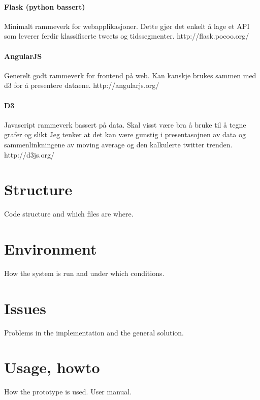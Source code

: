 \paragraph{Flask (python bassert)}
Minimalt rammeverk for webapplikasjoner. Dette gjør det enkelt å lage et API som
leverer ferdir klassifiserte tweets og tidssegmenter.
http://flask.pocoo.org/

\paragraph{AngularJS}
Generelt godt rammeverk for frontend på web. Kan kanskje brukes sammen med d3
for å presentere dataene.
http://angularjs.org/

\paragraph{D3}
Javascript rammeverk bassert på data.
Skal visst være bra å bruke til å tegne grafer og slikt
Jeg tenker at det kan være gunstig i presentasojnen av data og sammenlinkningene
av moving average og den kalkulerte twitter trenden.
http://d3js.org/

\section{Structure}
Code structure and which files are where.
\section{Environment}
How the system is run and under which conditions.
\section{Issues}
Problems in the implementation and the general solution.

\section{Usage, howto}
How the prototype is used. User manual. 

